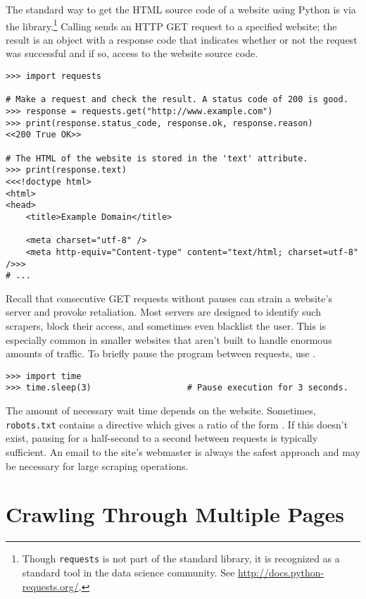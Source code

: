 The standard way to get the HTML source code of a website using Python is via the  library.\footnote{Though \texttt{requests} is not part of the standard library, it is recognized as a standard tool in the data science community. See \url{http://docs.python-requests.org/}.}
Calling  sends an HTTP GET request to a specified website; the result is an object with a response code that indicates whether or not the request was successful and if so, access to the website source code.

\begin{lstlisting}
>>> import requests

# Make a request and check the result. A status code of 200 is good.
>>> response = requests.get("http://www.example.com")
>>> print(response.status_code, response.ok, response.reason)
<<200 True OK>>

# The HTML of the website is stored in the 'text' attribute.
>>> print(response.text)
<<<!doctype html>
<html>
<head>
    <title>Example Domain</title>

    <meta charset="utf-8" />
    <meta http-equiv="Content-type" content="text/html; charset=utf-8" />>>
# ...
\end{lstlisting}

Recall that consecutive GET requests without pauses can strain a website's server and provoke retaliation.
Most servers are designed to identify such scrapers, block their access, and sometimes even blacklist the user.
This is especially common in smaller websites that aren't built to handle enormous amounts of traffic.
To briefly pause the program between requests, use .
\begin{lstlisting}
>>> import time
>>> time.sleep(3)                   # Pause execution for 3 seconds.
\end{lstlisting}

The amount of necessary wait time depends on the website.
Sometimes, \texttt{robots.txt} contains a  directive which gives a ratio of the form .
If this doesn't exist, pausing for a half-second to a second between requests is typically sufficient.
An email to the site's webmaster is always the safest approach and may be necessary for large scraping operations.


\section*{Crawling Through Multiple Pages} %

